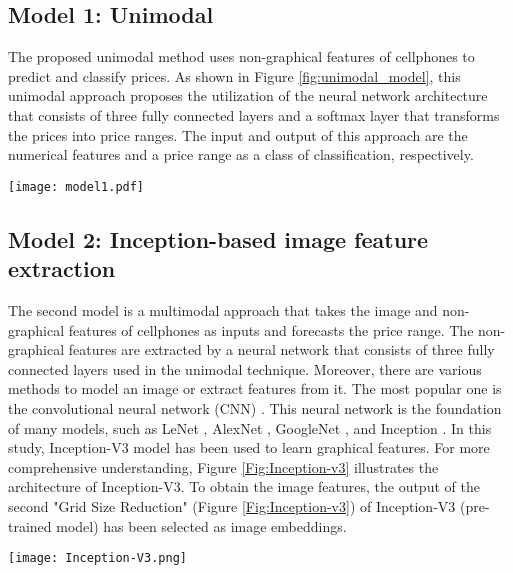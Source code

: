\documentclass{svjour3}                     \smartqed  \usepackage{graphicx}
\begin{document}
\subsection{Model 1: Unimodal} \label{Subsec:model_1}
The proposed unimodal method uses non-graphical features of cellphones to predict and classify prices. As shown in Figure \ref{fig:unimodal_model}, this unimodal approach proposes the utilization of the neural network architecture that consists of three fully connected layers and a softmax layer that transforms the prices into price ranges. The input and output of this approach are the numerical features and a price range as a class of classification, respectively.

\begin{figure*}
    \centering
    \texttt{[image: model1.pdf]}
    \caption{The neural network architecture of the proposed unimodal method.}
    \label{fig:unimodal_model}
\end{figure*}
\subsection{Model 2: Inception-based image feature extraction}\label{Subsec:model_2}
The second model is a multimodal approach that takes the image and non-graphical features of cellphones as inputs and forecasts the price range. The non-graphical features are extracted by a neural network that consists of three fully connected layers used in the unimodal technique. Moreover, there are various methods to model an image or extract features from it. The most popular one is the convolutional neural network (CNN) \cite{LeCun1989}. This neural network is the foundation of many models, such as LeNet \cite{LeCun1998}, AlexNet \cite{Krizhevsky2017}, GoogleNet \cite{Szegedy2015}, and Inception \cite{Szegedy2016,Szegedy2017}. In this study, Inception-V3 model has been used to learn graphical features. For more comprehensive understanding, Figure \ref{Fig:Inception-v3} illustrates the architecture of Inception-V3.  To obtain the image features, the output of the second "Grid Size Reduction" (Figure \ref{Fig:Inception-v3}) of Inception-V3 (pre-trained model) has been selected as image embeddings.


\begin{figure*}
	\centering
	\texttt{[image: Inception-V3.png]}
	\caption{Architecture of Inception-v3  \cite{MediumInception}.}
	\label{Fig:Inception-v3}
\end{figure*}
\end{document}
